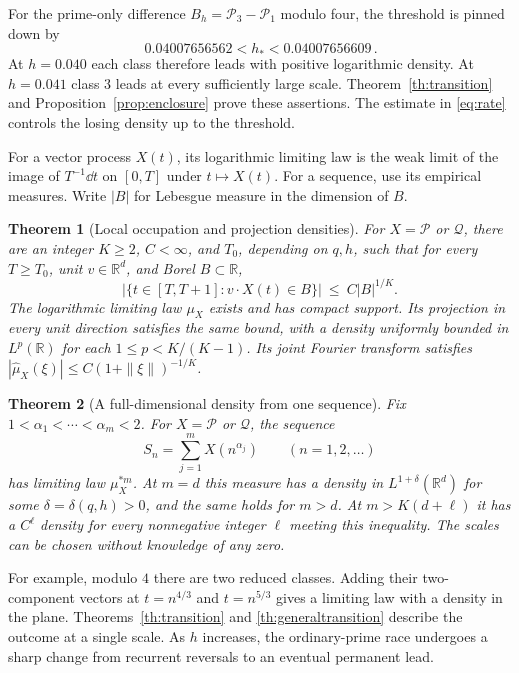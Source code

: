 \documentclass[11pt,letterpaper]{article}
\newtheorem{theorem}{Theorem}[section]
\newcommand{\R}{\mathbb R}\newcommand{\C}{\mathbb C}\newcommand{\T}{\mathbb T}
\newcommand{\PP}{\mathcal P}\newcommand{\QQ}{\mathcal Q}
\newcommand{\abs}[1]{\left|#1\right|}
\begin{document}
For the prime-only difference \(B_h=\PP_3-\PP_1\) modulo four, the threshold is pinned down by
\[
                 \boxed{\,0.04007656562<h_*<0.04007656609\,}.
\]
At \(h=0.040\) each class therefore leads with positive logarithmic density. At \(h=0.041\) class \(3\) leads at every sufficiently large scale. Theorem~\ref{th:transition} and Proposition~\ref{prop:enclosure} prove these assertions. The estimate in \eqref{eq:rate} controls the losing density up to the threshold.

For a vector process \(X(t)\), its logarithmic limiting law is the weak limit of the image of \(T^{-1}\dd t\) on \([0,T]\) under \(t\mapsto X(t)\). For a sequence, use its empirical measures. Write \(|B|\) for Lebesgue measure in the dimension of \(B\).

\begin{theorem}[Local occupation and projection densities]\label{th:local}
For \(X=\PP\) or \(\QQ\), there are an integer \(K\ge2\), \(C<\infty\), and \(T_0\), depending on \(q,h\), such that for every \(T\ge T_0\), unit \(v\in\R^d\), and Borel \(B\subset\R\),
\begin{equation}
 |\{t\in[T,T+1]:v\cdot X(t)\in B\}|\ \le\ C|B|^{1/K}.\label{eq:occupation}
\end{equation}
The logarithmic limiting law \(\mu_X\) exists and has compact support. Its projection in every unit direction satisfies the same bound, with a density uniformly bounded in \(L^p(\R)\) for each \(1\le p<K/(K-1)\). Its joint Fourier transform satisfies
\(\abs{\widehat\mu_X(\xi)}\le C(1+\|\xi\|)^{-1/K}\).
\end{theorem}

\begin{theorem}[A full-dimensional density from one sequence]\label{th:several}
Fix \(1<\alpha_1<\cdots<\alpha_m<2\). For \(X=\PP\) or \(\QQ\), the sequence
\begin{equation}
 S_n=\sum_{j=1}^m X(n^{\alpha_j})\qquad(n=1,2,\ldots)\label{eq:Sn}
\end{equation}
has limiting law \(\mu_X^{*m}\). At \(m=d\) this measure has a density in \(L^{1+\delta}(\R^d)\) for some \(\delta=\delta(q,h)>0\), and the same holds for \(m>d\). At \(m>K(d+\ell)\) it has a \(C^\ell\) density for every nonnegative integer \(\ell\) meeting this inequality. The scales can be chosen without knowledge of any zero.
\end{theorem}

For example, modulo \(4\) there are two reduced classes. Adding their two-component vectors at \(t=n^{4/3}\) and \(t=n^{5/3}\) gives a limiting law with a density in the plane. Theorems~\ref{th:transition} and \ref{th:generaltransition} describe the outcome at a single scale. As \(h\) increases, the ordinary-prime race undergoes a sharp change from recurrent reversals to an eventual permanent lead.
\end{document}
